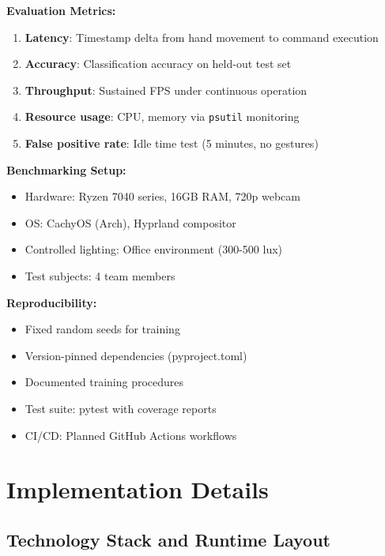 \documentclass[11pt,a4paper]{article}
\begin{document}
\textbf{Evaluation Metrics:}
\begin{enumerate}
\item \textbf{Latency}: Timestamp delta from hand movement to command execution
\item \textbf{Accuracy}: Classification accuracy on held-out test set
\item \textbf{Throughput}: Sustained FPS under continuous operation
\item \textbf{Resource usage}: CPU, memory via \texttt{psutil} monitoring
\item \textbf{False positive rate}: Idle time test (5 minutes, no gestures)
\end{enumerate}

\textbf{Benchmarking Setup:}
\begin{itemize}
\item Hardware: Ryzen 7040 series, 16GB RAM, 720p webcam
\item OS: CachyOS (Arch), Hyprland compositor
\item Controlled lighting: Office environment (300-500 lux)
\item Test subjects: 4 team members
\end{itemize}

\textbf{Reproducibility:}
\begin{itemize}
\item Fixed random seeds for training
\item Version-pinned dependencies (pyproject.toml)
\item Documented training procedures
\item Test suite: pytest with coverage reports
\item CI/CD: Planned GitHub Actions workflows
\end{itemize}

\section{Implementation Details}

\subsection{Technology Stack and Runtime Layout}
\end{document}
